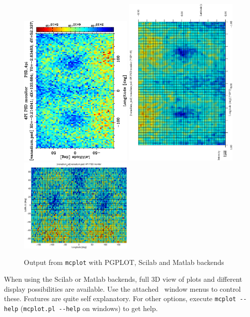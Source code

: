 \begin{figure}[htb!]
  \begin{center}
    \includegraphics[angle=-90,width=0.49\textwidth]{figures/mcplot_PGPLOT.ps}
    \includegraphics[angle=-90,width=0.49\textwidth]{figures/mcplot_Scilab.eps}
    \includegraphics[width=0.49\textwidth]{figures/mcplot_Matlab.eps}
  \end{center}
\caption{Output from \texttt{mcplot} with PGPLOT, Scilab and Matlab backends}
\label{fig:mcplot_figs}
\end{figure}
When using the Scilab or Matlab backends, full 3D view of plots and
different display possibilities are available. Use the attached \MCS\
window menus to control these. Features are quite self
explanatory. For other options, execute \verb+mcplot --help+
(\verb+mcplot.pl --help+ on windows) to get help. 


